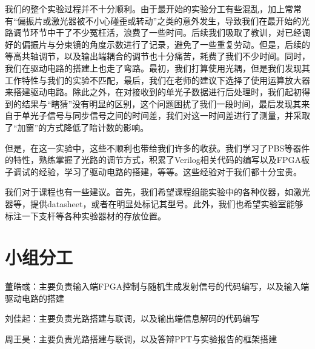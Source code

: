 \documentclass[UTF8]{ctexart}
\renewcommand\appendix{\par
	\setcounter{section}{0}
	\setcounter{subsection}{0}
	\gdef\thesection{附加说明}}
\begin{document}
我们的整个实验过程并不十分顺利。由于最开始的实验分工有些混乱，加上常常有“偏振片或激光器被不小心碰歪或转动”之类的意外发生，导致我们在最开始的光路调节环节中干了不少冤枉活，浪费了一些时间。后续我们吸取了教训，对已经调好的偏振片与分束镜的角度示数进行了记录，避免了一些重复劳动。但是，后续的等高共轴调节，以及输出端耦合的调节也十分痛苦，耗费了我们不少时间。同时，我们在驱动电路的搭建上也走了弯路。最初，我们打算使用光耦，但是我们发现其工作特性与我们的实验不匹配，最后，我们在老师的建议下选择了使用运算放大器来搭建驱动电路。除此之外，在对接收到的单光子数据进行后处理时，我们起初得到的结果与“瞎猜”没有明显的区别，这个问题困扰了我们一段时间，最后发现其来自于单光子信号与同步信号之间的时间差，我们对这一时间差进行了测量，并采取了“加窗”的方式降低了暗计数的影响。

但是，在这一实验中，这些不顺利也带给我们许多的收获。我们学习了PBS等器件的特性，熟练掌握了光路的调节方式，积累了Verilog相关代码的编写以及FPGA板子调试的经验，学习了驱动电路的搭建，等等。这些经验对于我们都十分宝贵。

我们对于课程也有一些建议。首先，我们希望课程组能实验中的各种仪器，如激光器等，提供datasheet，或者在明显处标记其型号。此外，我们也希望实验室能够标注一下支杆等各种实验器材的存放位置。

\appendix
\section{小组分工}

董皓彧：主要负责输入端FPGA控制与随机生成发射信号的代码编写，以及输入端驱动电路的搭建

刘佳起：主要负责光路搭建与联调，以及输出端信息解码的代码编写

周王昊：主要负责光路搭建与联调，以及答辩PPT与实验报告的框架搭建
\end{document}

